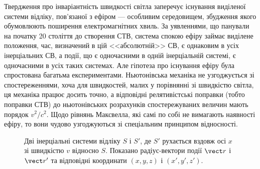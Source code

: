 Твердження про інваріантність швидкості світла заперечує існування виділеної системи відліку, пов'язаної з ефіром --- особливим середовищем, збудження якого обумовлюють поширення електромагнітних хвиль. За уявленнями, що панували на початку 20 століття до створення СТВ, система спокою ефіру займає виділене положення, час, визначений в цій <<абсолютній>> СВ, є однаковим в усіх інерціальних СВ, а події, що є одночасними в одній інерціальній системі, є одночасними в усіх таких системах. Але гіпотеза про існування ефіру була спростована багатьма експериментами. Ньютонівська механіка не узгоджується зі спостереженнями, хоча для швидкостей, малих у порівнянні зі швидкістю світла, ця механіка працює досить точно, а відповідні релятивістські поправки (тобто поправки СТВ) до ньютонівських розрахунків спостережуваних величин мають порядок $v^2/c^2$. Щодо рівнянь Максвелла, які самі по собі не вимагають наявності ефіру, то вони чудово узгоджуються зі спеціальним принципом відносності.


\begin{figure}[h!]\centering
\caption{Дві інерціальні системи відліку $S$ і $S'$, де $S'$ рухається вздовж осі $x$ зі швидкістю $v$ відносно $S$. Показано радіус-вектори події $\vect r$ і $\vect r'$ та відповідні координати $(x,y,z)$ і $(x',y',z')$.}
\label{pic:boost}
\end{figure}


